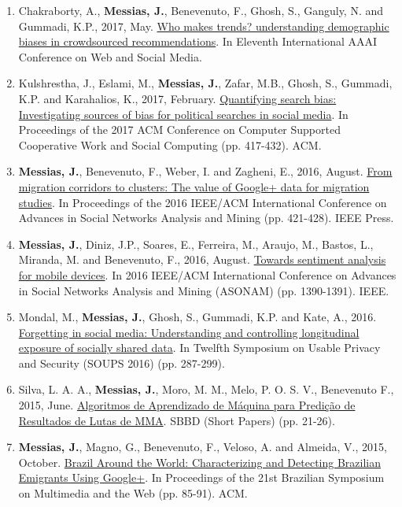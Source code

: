 \begin{enumerate}
    \item Chakraborty, A., \textbf{Messias, J.}, Benevenuto, F., Ghosh, S., Ganguly, N. and Gummadi, K.P., 2017, May. \href{https://people.mpi-sws.org/~johnme/pdf/chakraborty_icwsm17_who_makes_trends.pdf}{Who makes trends? understanding demographic biases in crowdsourced recommendations}. In Eleventh International AAAI Conference on Web and Social Media.
    \item Kulshrestha, J., Eslami, M., \textbf{Messias, J.}, Zafar, M.B., Ghosh, S., Gummadi, K.P. and Karahalios, K., 2017, February. \href{https://people.mpi-sws.org/~johnme/pdf/kulshrestha_cscw17_search_bias.pdf}{Quantifying search bias: Investigating sources of bias for political searches in social media}. In Proceedings of the 2017 ACM Conference on Computer Supported Cooperative Work and Social Computing (pp. 417-432). ACM.
    \item \textbf{Messias, J.}, Benevenuto, F., Weber, I. and Zagheni, E., 2016, August. \href{https://people.mpi-sws.org/~johnme/pdf/messias_asonam16_migration.pdf}{From migration corridors to clusters: The value of Google+ data for migration studies}. In Proceedings of the 2016 IEEE/ACM International Conference on Advances in Social Networks Analysis and Mining (pp. 421-428). IEEE Press.
    \item \textbf{Messias, J.}, Diniz, J.P., Soares, E., Ferreira, M., Araujo, M., Bastos, L., Miranda, M. and Benevenuto, F., 2016, August. \href{https://people.mpi-sws.org/~johnme/pdf/messias_asonam16_mobile.pdf}{Towards sentiment analysis for mobile devices}. In 2016 IEEE/ACM International Conference on Advances in Social Networks Analysis and Mining (ASONAM) (pp. 1390-1391). IEEE.
    \item Mondal, M., \textbf{Messias, J.}, Ghosh, S., Gummadi, K.P. and Kate, A., 2016. \href{https://people.mpi-sws.org/~johnme/pdf/mainack_soups16.pdf}{Forgetting in social media: Understanding and controlling longitudinal exposure of socially shared data}. In Twelfth Symposium on Usable Privacy and Security ({SOUPS} 2016) (pp. 287-299).
    \item Silva, L. A. A., \textbf{Messias, J.}, Moro, M. M., Melo, P. O. S. V., Benevenuto F., 2015, June. \href{https://people.mpi-sws.org/~johnme/pdf/leandro_sbbd15.pdf}{Algoritmos de Aprendizado de Máquina para Predição de Resultados de Lutas de MMA}. SBBD (Short Papers) (pp. 21-26).
    \item \textbf{Messias, J.}, Magno, G., Benevenuto, F., Veloso, A. and Almeida, V., 2015, October. \href{https://people.mpi-sws.org/~johnme/pdf/messias_webmedia15.pdf}{Brazil Around the World: Characterizing and Detecting Brazilian Emigrants Using Google+}. In Proceedings of the 21st Brazilian Symposium on Multimedia and the Web (pp. 85-91). ACM.

\end{enumerate}
